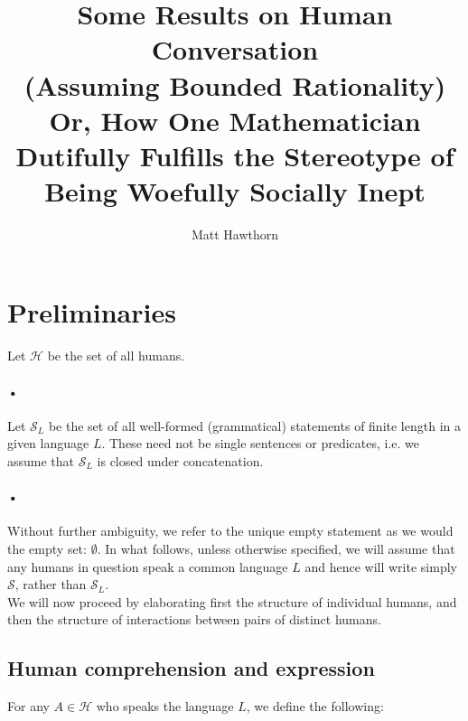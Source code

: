 \documentclass[12pt]{article}
\begin{document}
\nocite{*}

\title{
\textnormal{Some Results on Human Conversation \\(Assuming Bounded Rationality)}\\ 
\small{Or, How One Mathematician Dutifully Fulfills the Stereotype of Being Woefully Socially Inept}}

\author{Matt Hawthorn}
\date{}
\maketitle

\section{Preliminaries}
\paragraph*{}
Let $\mathcal{H}$ be the set of all humans. 
\paragraph*{•}
Let $\mathcal{S}_L$ be the set of all well-formed (grammatical) statements of finite length in a given language $L$. These need not be single sentences or predicates, i.e. we assume that $\mathcal{S}_L$ is closed under concatenation.
\paragraph*{•}
Without further ambiguity, we refer to the unique empty statement as we would the empty set: $\emptyset$.  In what follows, unless otherwise specified, we will assume that any humans in question speak a common language $L$ and hence will write simply $\mathcal{S}$, rather than $\mathcal{S}_L$.\\

We will now proceed by elaborating first the structure of individual humans, and then the structure of interactions between pairs of distinct humans.

\subsection{Human comprehension and expression}
For any $A\in\mathcal{H}$ who speaks the language $L$, we define the following:
\end{document}

